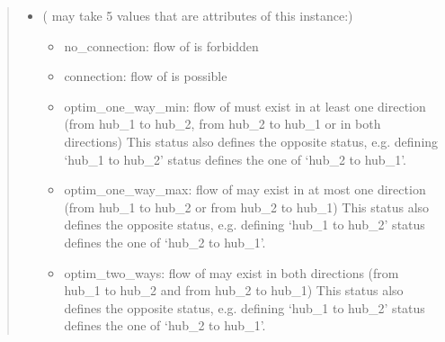 \documentclass[letterpaper,10pt,english]{sphinxmanual}
\begin{document}
\begin{fulllineitems}
\begin{fulllineitems}
\begin{quote}
\begin{description}
\begin{itemize}
\item {} 
\sphinxAtStartPar
{} ( may take 5 values that are attributes of this instance:) \textendash{} \begin{itemize}
\item {} 
\sphinxAtStartPar
no\_connection: flow of  is forbidden

\item {} 
\sphinxAtStartPar
connection: flow of  is possible

\item {} 
\sphinxAtStartPar
optim\_one\_way\_min: flow of  must exist in at least one direction
(from hub\_1 to hub\_2, from hub\_2 to hub\_1 or in both directions)
This status also defines the opposite status, e.g. defining ‘hub\_1 to hub\_2’ status defines the one of ‘hub\_2 to hub\_1’.

\item {} 
\sphinxAtStartPar
optim\_one\_way\_max: flow of  may exist in at most one direction
(from hub\_1 to hub\_2 or from hub\_2 to hub\_1)
This status also defines the opposite status, e.g. defining ‘hub\_1 to hub\_2’ status defines the one of ‘hub\_2 to hub\_1’.

\item {} 
\sphinxAtStartPar
optim\_two\_ways: flow of  may exist in both directions
(from hub\_1 to hub\_2 and from hub\_2 to hub\_1)
This status also defines the opposite status, e.g. defining ‘hub\_1 to hub\_2’ status defines the one of ‘hub\_2 to hub\_1’.

\end{itemize}


\end{itemize}

\end{description}\end{quote}

\end{fulllineitems}



\end{fulllineitems}
\end{document}
